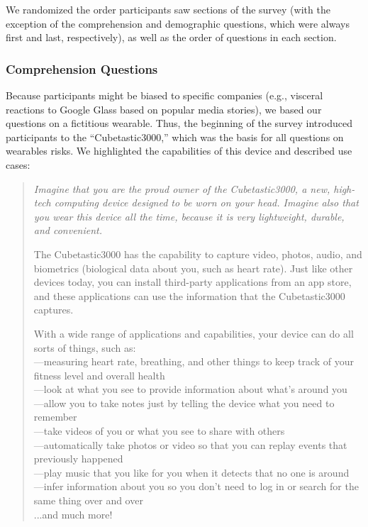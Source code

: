 We randomized the order participants saw sections of the survey (with the exception of the comprehension and demographic questions, which were always first and last, respectively), as well as the order of questions in each section.

\subsubsection{Comprehension Questions}
Because participants might be biased to specific companies (e.g., visceral reactions to Google Glass based on popular media stories), we based our questions on a fictitious wearable. Thus, the beginning of the survey introduced participants to the ``Cubetastic3000,'' which was the basis for all questions on wearables risks. We highlighted the capabilities of this device and described use cases:

\begin{quotation}
{\it Imagine that you are the proud owner of the Cubetastic3000, a new, high-tech computing device designed to be worn on your head. Imagine also that you wear this device all the time, because it is very lightweight, durable, and convenient.

The Cubetastic3000 has the capability to capture video, photos, audio, and biometrics (biological data about you, such as heart rate). Just like other devices today, you can install third-party applications from an app store, and these applications can use the information that the Cubetastic3000 captures.

With a wide range of applications and capabilities, your device can do all sorts of things, such as:\\

\noindent---measuring heart rate, breathing, and other things to keep track of your fitness level and overall health\\

\noindent---look at what you see to provide information about what's around you\\

\noindent---allow you to take notes just by telling the device what you need to remember\\

\noindent---take videos of you or what you see to share with others\\

\noindent---automatically take photos or video so that you can replay events that previously happened\\

\noindent---play music that you like for you when it detects that no one is around\\

\noindent---infer information about you so you don't need to log in or search for the same thing over and over\\

\noindent ...and much more!}
\end{quotation}


